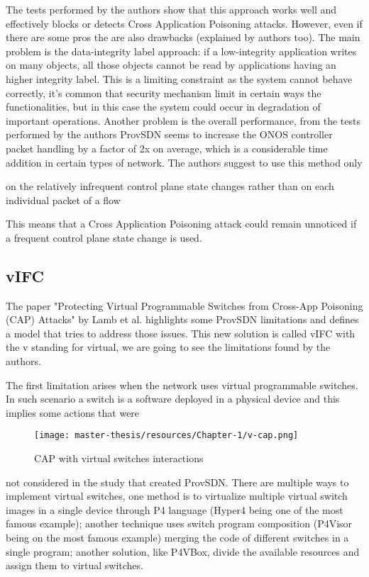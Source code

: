 \documentclass[a4paper,10pt]{memoir}
\begin{document}
The tests performed by the authors show that this approach works well and effectively blocks or detects Cross Application Poisoning attacks. However, even if there are some pros the are also drawbacks (explained by authors too). The main problem is the data-integrity label approach: if a low-integrity application writes on many objects, all those objects cannot be read by applications having an higher integrity label. This is a limiting constraint as the system cannot behave correctly, it's common that security mechanism limit in certain ways the functionalities, but in this case the system could occur in degradation of important operations. Another problem is the overall performance, from the tests performed by the authors ProvSDN seems to increase the ONOS controller packet handling by a factor of 2x on average, which is a considerable time addition in certain types of network. The authors suggest to use this method only \begin{quoting}[font=itshape, begintext={"}, endtext={"}]on the relatively infrequent control plane state changes rather than on each individual packet of a flow\end{quoting} This means that a Cross Application Poisoning attack could remain unnoticed if a frequent control plane state change is used. 

\subsection{vIFC}

The paper "Protecting Virtual Programmable Switches from Cross-App Poisoning (CAP) Attacks" by Lamb et al. highlights some ProvSDN limitations and defines a model that tries to address those issues. This new solution is called vIFC with the v standing for virtual, we are going to see the limitations found by the authors.\cite{virtual-cap-sdn}

The first limitation arises when the network uses virtual programmable switches. In such scenario a switch is a software deployed in a physical device and this implies some actions that were
\begin{wrapfigure}[17]{h}{0.55\textwidth}
\caption{CAP with virtual switches interactions}
\label{fig:vcap}
\texttt{[image: master-thesis/resources/Chapter-1/v-cap.png]}
\end{wrapfigure}
not considered in the study that created ProvSDN. 
There are multiple ways to implement virtual switches, one method is to virtualize multiple virtual switch images in a single device through P4 language (Hyper4 being one of the most famous example); another technique uses switch program composition (P4Visor being on the most famous example) merging the code of different switches in a single program; another solution, like P4VBox, divide the available resources and assign them to virtual switches. 
\end{document}
